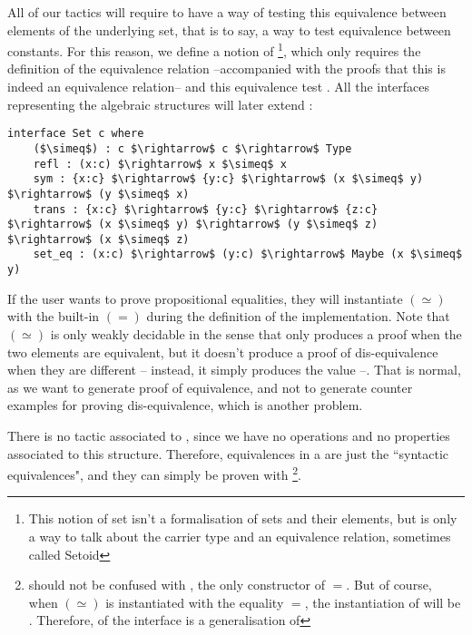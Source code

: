 All of our tactics will require to have a way of testing this equivalence between elements of the underlying set, that is to say, a way to test equivalence between constants. For this reason, we define a notion of \footnote{This notion of set isn't a formalisation of sets and their elements, but is only a way to talk about the carrier type and an equivalence relation, sometimes called Setoid}, which only requires the definition of the equivalence relation --accompanied with the proofs that this is indeed an equivalence relation-- and this equivalence test . All the interfaces representing the algebraic structures will later extend  :

\begin{lstlisting}
interface Set c where
    ($\simeq$) : c $\rightarrow$ c $\rightarrow$ Type
    refl : (x:c) $\rightarrow$ x $\simeq$ x
    sym : {x:c} $\rightarrow$ {y:c} $\rightarrow$ (x $\simeq$ y) $\rightarrow$ (y $\simeq$ x)
    trans : {x:c} $\rightarrow$ {y:c} $\rightarrow$ {z:c} $\rightarrow$ (x $\simeq$ y) $\rightarrow$ (y $\simeq$ z) $\rightarrow$ (x $\simeq$ z)    
    set_eq : (x:c) $\rightarrow$ (y:c) $\rightarrow$ Maybe (x $\simeq$ y)
\end{lstlisting}

If the user wants to prove propositional equalities, they will instantiate $(\simeq)$ with the built-in $(=)$ during the definition of the  implementation.
Note that $(\simeq)$ is only weakly decidable in the sense that  only produces a proof when the two elements are equivalent, but it doesn't produce a proof of dis-equivalence when they are different -- instead, it simply produces the value --. That is normal, as we want to generate proof of equivalence, and not to generate counter examples for proving dis-equivalence, which is another problem.

There is no tactic associated to , since we have no operations and no properties associated to this structure. Therefore, equivalences in a  are just the ``syntactic equivalences", and they can simply be proven with \footnote{ should not be confused with , the only constructor of $=$. But of course, when $(\simeq)$ is instantiated with the equality $=$, the instantiation of  will be . Therefore,  of the interface  is a generalisation of }.


